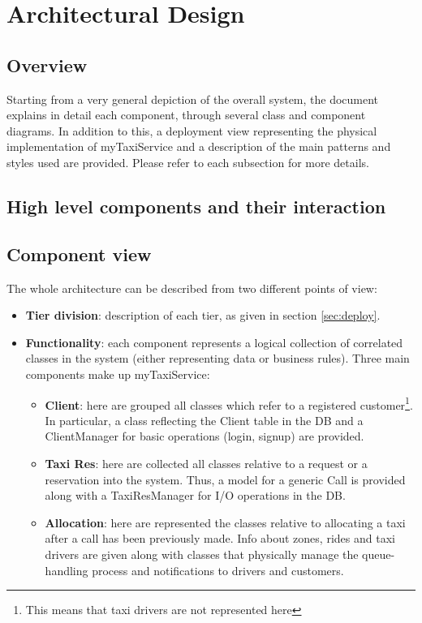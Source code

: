 \pagebreak
\section{Architectural Design}
 
\subsection{Overview}
Starting from a very general depiction of the overall system, the document explains in detail each component, through several class and component diagrams. In addition to this, a deployment view representing the physical implementation of myTaxiService and a description of the main patterns and styles used are provided. Please refer to each subsection for more details.

\subsection{High level components and their interaction}

\subsection{Component view}
The whole architecture can be described from two different points of view: 
\begin{itemize}
	\item \textbf{Tier division}: description of each tier, as given in section \ref{sec:deploy}.
	\item \textbf{Functionality}: each component represents a logical collection of correlated classes in the system (either representing data or business rules). Three main components make up myTaxiService:
	\begin{itemize}
		\item \textbf{Client}: here are grouped all classes which refer to a registered customer\footnote{This means that taxi drivers are not represented here}. In particular, a class reflecting the Client table in the DB and a ClientManager for basic operations (login, signup) are provided.
		\newpage
		\item \textbf{Taxi Res}: here are collected all classes relative to a request or a reservation into the system. Thus, a model for a generic Call is provided along with a TaxiResManager for I/O operations in the DB.
		\newpage
		\item \textbf{Allocation}: here are represented the classes relative to allocating a taxi after a call has been previously made. Info about zones, rides and taxi drivers are given along with classes that physically manage the queue-handling process and notifications to drivers and customers.
		\newpage
	\end{itemize}
\end{itemize}

